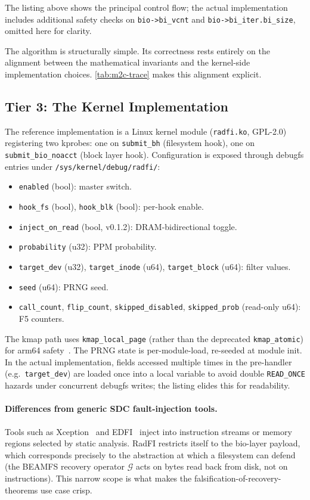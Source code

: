 The listing above shows the principal control flow; the actual
implementation includes additional safety checks on
\texttt{bio->bi\_vcnt} and \texttt{bio->bi\_iter.bi\_size},
omitted here for clarity.

The algorithm is structurally simple. Its correctness rests entirely
on the alignment between the mathematical invariants and the
kernel-side implementation choices. \cref{tab:m2c-trace} makes this
alignment explicit.

\subsection{Tier 3: The Kernel Implementation}

The reference implementation is a Linux kernel module
(\texttt{radfi.ko}, GPL-2.0) registering two kprobes: one on
\texttt{submit\_bh} (filesystem hook), one on
\texttt{submit\_bio\_noacct} (block layer hook). Configuration is
exposed through debugfs entries under
\texttt{/sys/kernel/debug/radfi/}:

\begin{itemize}
\item \texttt{enabled} (bool): master switch.
\item \texttt{hook\_fs} (bool), \texttt{hook\_blk} (bool): per-hook
  enable.
\item \texttt{inject\_on\_read} (bool, v0.1.2): DRAM-bidirectional
  toggle.
\item \texttt{probability} (u32): PPM probability.
\item \texttt{target\_dev} (u32), \texttt{target\_inode} (u64),
  \texttt{target\_block} (u64): filter values.
\item \texttt{seed} (u64): PRNG seed.
\item \texttt{call\_count}, \texttt{flip\_count},
  \texttt{skipped\_disabled}, \texttt{skipped\_prob} (read-only u64):
  F5 counters.
\end{itemize}

The kmap path uses \texttt{kmap\_local\_page} (rather than the
deprecated \texttt{kmap\_atomic}) for arm64
safety~\cite{kernel-highmem}. The PRNG state is per-module-load,
re-seeded at module init. In the actual implementation, fields
accessed multiple times in the pre-handler (e.g.\ \texttt{target\_dev})
are loaded once into a local variable to avoid double
\texttt{READ\_ONCE} hazards under concurrent debugfs writes; the
listing elides this for readability.

\paragraph{Differences from generic SDC fault-injection tools.}
Tools such as Xception~\cite{carreira1998xception} and
EDFI~\cite{giuffrida2013edfi} inject into instruction streams or
memory regions selected by static analysis. RadFI restricts itself
to the bio-layer payload, which corresponds precisely to the
abstraction at which a filesystem can defend (the BEAMFS recovery
operator \(\mathcal{G}\) acts on bytes read back from disk, not on
instructions). This narrow scope is what makes the
falsification-of-recovery-theorems use case crisp.

